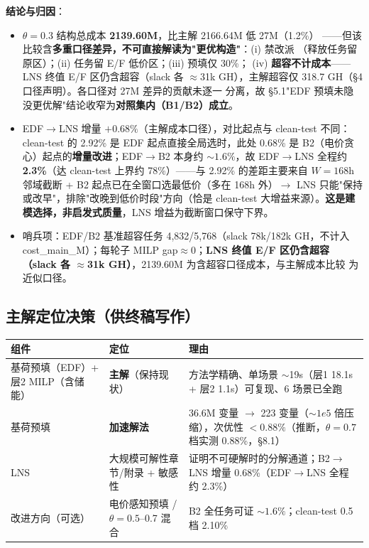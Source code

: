 \documentclass{internal-report}
\begin{document}
\textbf{结论与归因}：
\begin{itemize}
  \item $\theta{=}0.3$ 结构总成本 \textbf{2139.60M}，比主解 2166.64M 低 27M（1.2\%）
        ——但该比较含\textbf{多重口径差异，不可直接解读为"更优构造"}：(i) 禁改派
        （释放任务留原区）；(ii) 任务留 E/F 低价区；(iii) 预填仅 30\%；
        (iv) \textbf{超容不计成本}——LNS 终值 E/F 区仍含超容（slack 各 $\approx$31k
        GH），主解超容仅 318.7 GH（§4 口径声明）。各口径对 27M 差异的贡献未逐一
        分离，故 §5.1"EDF 预填未隐没更优解"结论收窄为\textbf{对照集内（B1/B2）成立}。
  \item EDF$\to$LNS 增量 \textbf{$+0.68\%$}（主解成本口径），对比起点与 clean-test
        不同：clean-test 的 2.92\% 是 EDF 起点直接全局选时，此处 0.68\% 是
        B2（电价贪心）起点的\textbf{增量改进}；EDF$\to$B2 本身约 $\sim 1.6\%$，故
        EDF$\to$LNS 全程约 \textbf{2.3\%}（达 clean-test 上界约 78\%）——与 2.92\%
        的差距主要来自 $W{=}168$h 邻域截断 + B2 起点已在全窗口选最低价（多在 168h
        外）$\to$ LNS 只能"保持或改早"，排除"改晚到低价时段"方向（恰是 clean-test
        大增益来源）。\textbf{这是建模选择，非启发式质量}，LNS 增益为截断窗口保守下界。
  \item 哨兵项：EDF/B2 基准超容任务 4,832/5,768（slack 78k/182k GH，不计入
        cost\_main\_M）；每轮子 MILP gap$\approx0$；\textbf{LNS 终值 E/F 区仍含超容
        （slack 各 $\approx$31k GH）}，2139.60M 为含超容口径成本，与主解成本比较
        为近似口径。
\end{itemize}

\subsection{主解定位决策（供终稿写作）}

\begin{center}
\footnotesize
\begin{tabular}{>{\centering\arraybackslash}p{3.6cm} >{\centering\arraybackslash}p{2.6cm} >{\raggedright\arraybackslash}p{7.0cm}}
\toprule
组件 & 定位 & 理由 \\
\midrule
基荷预填（EDF）+ 层2 MILP（含储能） & \textbf{主解}（保持现状） & 方法学精确、单场景 $\sim$19s（层1 18.1s + 层2 1.1s）可复现、6 场景已全跑 \\
基荷预填 & \textbf{加速解法} & 36.6M 变量 $\to$ 223 变量（$\sim 1e5$ 倍压缩），次优性 $<0.88\%$（推断，$\theta{=}0.7$ 档实测 0.88\%，§8.1） \\
LNS & 大规模可解性章节/附录 + 敏感性 & 证明不可硬解时的分解通道；B2$\to$LNS 增量 0.68\%（EDF$\to$LNS 全程约 2.3\%） \\
改进方向（可选） & 电价感知预填 / $\theta{=}0.5$--0.7 混合 & B2 全任务可证 $\sim 1.6\%$；clean-test 0.5 档 2.10\% \\
\bottomrule
\end{tabular}
\end{center}
\end{document}
